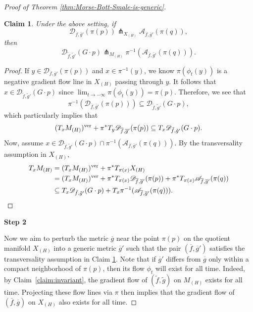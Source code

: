 \documentclass[11pt]{amsart}
\newtheorem{claim}[theorem]{Claim}
\theoremstyle{definition}
\numberwithin{equation}{subsection}
\newcommand{\des}{\mathscr{D}}
\newcommand{\asc}{\mathscr{A}}
\begin{document}
\begin{proof}[Proof of Theorem \ref{thm:Morse-Bott-Smale-is-generic}]
\begin{claim}\label{claim:liftfromXHtoMH}
    Under the above setting, if  \[\des_{\overline{f},\overline{g}'}(\pi(p))\pitchfork_{X_{(H)}}\asc_{\overline{f},\overline{g}'}(\pi(q)),\]
    then \[\des_{\tilde{f},\tilde{g}'}(G\cdot p)\pitchfork_{M_{(H)}}\pi^{-1}(\asc_{\overline{f},\overline{g}'}(\pi(q))).\]
\end{claim}

\begin{proof}
       If $y\in \des_{\overline{f},\overline{g}'}(\pi(p))$ and $x\in \pi^{-1}(y)$, we know $\pi(\phi_t(y))$ is a negative gradient flow line in $X_{(H)}$ passing through $y$. It follows that $x\in \des_{\tilde{f},\tilde{g}'}(G\cdot p)$ since $\lim_{t\rightarrow -\infty}\pi(\phi_t(y))=\pi(p)$.
       Therefore, we see that
       \[\pi^{-1}(\des_{\overline{f},\overline{g}'}(\pi(p)))\subseteq\des_{\tilde{f},\tilde{g}'}(G\cdot p),\] which particularly implies that \[(T_xM_{(H)})^{\rm{ver}}+\pi^*T_{y}\des_{\overline{f},\overline{g}'}(\pi(p))\subseteq T_x\des_{\tilde{f},\tilde{g}'}(G\cdot p).\] Now, assume $x\in \des_{\tilde{f},\tilde{g}'}(G\cdot p)\cap\pi^{-1}(\asc_{\overline{f},\overline{g}'}(\pi(q)))$. By the transversality assumption in $X_{(H)}$,
       \begin{align*}
           T_xM_{(H)}&=(T_xM_{(H)})^{\rm{ver}}+ \pi^*T_{\pi(x)}X_{(H)}\\
           &=(T_xM_{(H)})^{\rm{ver}}+\pi^*T_{\pi(x)}\des_{\overline{f},\overline{g}'}(\pi(p))+\pi^*T_{\pi(x)}\asc_{\overline{f},\overline{g}'}(\pi(q))\\
           &\subseteq T_x\des_{\tilde{f},\tilde{g}'}(G\cdot p)+T_x\pi^{-1}(\asc_{\overline{f},\overline{g}'}(\pi(q))).
       \end{align*}
\end{proof}

\medskip
 \noindent\textbf{Step 2}
 
Now we aim to perturb the metric $\overline{g}$ near the point $\pi(p)$ on the quotient manifold $X_{(H)}$ into a generic metric $\overline{g}'$ such that the pair $(\overline{f},\overline{g}')$ satisfies the transversality assumption in Claim \ref{claim:liftfromXHtoMH}. Note that if $\overline g'$ differs from $\overline g$ only within a compact neighborhood of $\pi(p)$, then its flow $\phi_t$ will exist for all time. Indeed, by Claim~\ref{claim:invariant}, the gradient flow of $(\tilde f,\tilde g)$ on $M_{(H)}$ exists for all time. Projecting these flow lines via $\pi$ then 
implies that the gradient flow of $(\overline f,\overline g)$ on $X_{(H)}$ also exists for all time. 
 

\end{proof}
\end{document}
